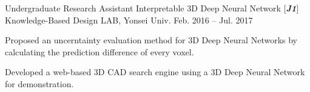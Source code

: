 \begin{cventries}

\cventry
{Undergraduate Research Assistant} %
{Interpretable 3D Deep Neural Network [\textit{\textbf{J1}}]} %
{Knowledge-Based Design LAB, Yonsei Univ.} %
{Feb. 2016 – Jul. 2017} %
{ %
\begin{cvitems}
\item {Proposed an uncerntainty evaluation method for 3D Deep Neural Networks by calculating the prediction difference of every voxel.}
\item {Developed a web-based 3D CAD search engine using a 3D Deep Neural Network for demonstration.}
\end{cvitems}
}


\end{cventries}
